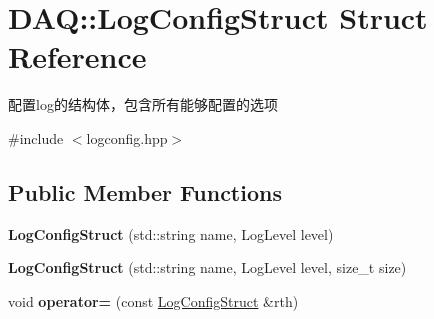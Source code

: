 \hypertarget{structDAQ_1_1LogConfigStruct}{}\section{D\+AQ\+:\+:Log\+Config\+Struct Struct Reference}
\label{structDAQ_1_1LogConfigStruct}


配置log的结构体，包含所有能够配置的选项  




{\ttfamily \#include $<$logconfig.\+hpp$>$}

\subsection*{Public Member Functions}
\begin{DoxyCompactItemize}
\item 
\mbox{\label{structDAQ_1_1LogConfigStruct_a09e6bd7faf9780d734261ab236dbba6a}} 
{\bfseries Log\+Config\+Struct} (std\+::string name, Log\+Level level)
\item 
\mbox{\label{structDAQ_1_1LogConfigStruct_a38a0b7c47a1adc9a2aad04a4438601f0}} 
{\bfseries Log\+Config\+Struct} (std\+::string name, Log\+Level level, size\+\_\+t size)
\item 
\mbox{\label{structDAQ_1_1LogConfigStruct_a8ca34b8f0894266bf7e1302e3c1798a1}} 
void {\bfseries operator=} (const \hyperlink{structDAQ_1_1LogConfigStruct}{Log\+Config\+Struct} \&rth)
\end{DoxyCompactItemize}
